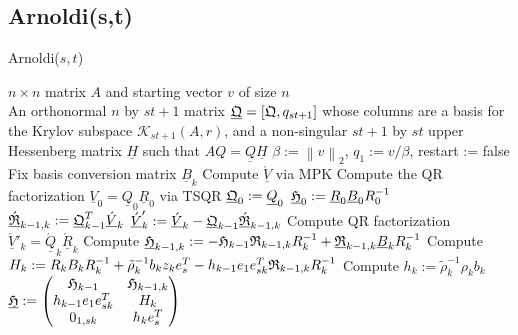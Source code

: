 \documentclass{scrartcl}
\newcommand{\norm}[1]{\left\lVert#1\right\rVert}
\begin{document}
\subsection{Arnoldi(s,t)}

\begin{algorithm}[H]
\caption{Arnoldi($s,t$)}
\label{alg:arnoldi(s,t)}
\begin{algorithmic}[1]
    \REQUIRE $n \times n$ matrix $A$ and starting vector $v$ of size $n$\\
    \ENSURE An orthonormal $n$ by $st + 1$ matrix $\underline{\frak{Q}} = \left[\frak{Q},q_{st + 1}\right]$ whose columns are a basis for the Krylov subspace $\mathcal{K}_{st + 1}(A,r)$, and a non-singular $st + 1$ by $st$ upper Hessenberg matrix $\underline{H}$ such that $AQ = \underline{Q} \underline{H}$
    \STATE $\beta := \norm{v}_2$, $q_1 := v/\beta$, restart := false
    	\STATE Fix basis conversion matrix $\underline{B}_k$
    	\STATE Compute $\underline{\acute{V}}$ via MPK
 	 		\STATE Compute the QR factorization $\underline{V}_0 = \underline{Q}_0 \underline{R}_0$ via TSQR
 	 	\STATE $\underline{\frak{Q}}_0 := \underline{Q}_0$
    	\STATE $\underline{\frak{H}}_0 := \underline{R}_0 \underline{B}_0 R_0^{-1}$
    	\ELSE
    		\STATE $\underline{\acute{\frak{R}}}_{k - 1, k} := \underline{\frak{Q}}^T_{k - 1} \underline{\acute{V}}_k$
    	\STATE $\underline{\acute{V}}_k' := \underline{\acute{V}}_k - \underline{\frak{Q}}_{k - 1} \underline{\acute{\frak{R}}}_{k - 1, k}$
    	\STATE Compute QR factorization $\underline{\acute{V}}'_k = \underline{\acute{Q}}_k \underline{\acute{R}}_k$
    	\STATE Compute $\underline{\frak{H}}_{k - 1, k} := - \frak{H}_{k - 1} \frak{R}_{k - 1, k} R^{-1}_k + \underline{\frak{R}}_{k - 1, k} \underline{B}_k R^{-1}_k$
		\STATE Compute $H_k := R_k B_k R^{-1}_k + \tilde{\rho}^{-1}_k b_k z_k e^T_s - h_{k-1} e_1 e^T_{sk} \frak{R}_{k-1,k} R^{-1}_k$
		\STATE Compute $h_k := \tilde{\rho}^{-1}_k \rho_k b_k$
    	\STATE $\underline{\frak{H}} : = 
    	\begin{pmatrix}
    		\frak{H}_{k - 1} & \frak{H}_{k - 1, k}\\
    		h_{k - 1} e_1 e_{sk}^T & H_k\\
    		0_{1,sk} & h_k e^T_s
    	\end{pmatrix}$
    	\ENDIF
	\ENDFOR
\end{algorithmic}
\end{algorithm}
\end{document}
